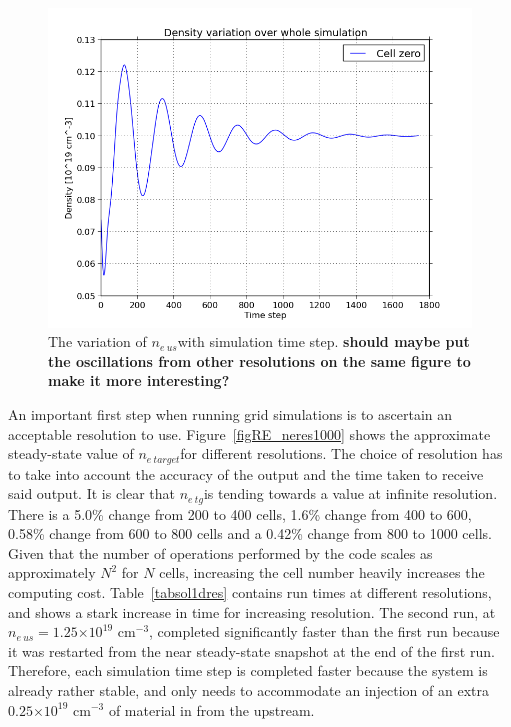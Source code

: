 \documentclass[11pt]{article}  %
\providecommand{\e}[1]{\ensuremath{\times 10^{#1}}} %
\providecommand{\neus}{$n_{e~us}$} %
\providecommand{\netarget}{$n_{e~target}$} %
\providecommand{\netg}{$n_{e~tg}$} %
\begin{document}
\begin{figure}
\includegraphics[scale=0.4]{Figures/sol1d/ne_var_ny=800.png}
\centering
\caption{The variation of \neus with simulation time step. \textbf{should maybe put the oscillations from other resolutions on the same figure to make it more interesting?}}\label{figne_var_ny=800}
\end{figure}

An important first step when running grid simulations is to ascertain an acceptable resolution to use. Figure~\ref{figRE_neres1000} shows the approximate steady-state value of \netarget for different resolutions. The choice of resolution has to take into account the accuracy of the output and the time taken to receive said output. It is clear that \netg is tending towards a value at infinite resolution. There is a 5.0\% change from 200 to 400 cells, 1.6\% change from 400 to 600, 0.58\% change from 600 to 800 cells and a 0.42\% change from 800 to 1000 cells. Given that the number of operations performed by the code scales as approximately $N^2$ for $N$ cells, increasing the cell number heavily increases the computing cost. Table~\ref{tabsol1dres} contains run times at different resolutions, and shows a stark increase in time for increasing resolution. The second run, at \neus $= 1.25\e{19}$ cm$^{-3}$, completed significantly faster than the first run because it was restarted from the near steady-state snapshot at the end of the first run. Therefore, each simulation time step is completed faster because the system is already rather stable, and only needs to accommodate an injection of an extra $0.25\e{19}$ cm$^{-3}$ of material in from the upstream.
\end{document}
